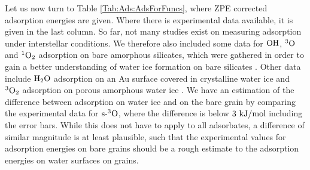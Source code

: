 \documentclass[8.5pt,twoside,twocolumn]{article}
\newcommand\zpe{\enmat{\te{ZPE}}}
\newcommand\sur{\enmat{\te{s-}}}
\renewcommand\K{{\enmat{~\te{K}}}}
\newcommand\tripo{\enmat{{^3\te{O}}}}
\newcommand\singot{\enmat{{^1\ot}}}
\newcommand\tripot{\enmat{{^3\ot}}}
\newcommand\kmo{\enmat{\te {kJ/mol}}}
\theoremstyle{standard}
\begin{document}
Let us now turn to Table \ref{Tab:Ads:AdsForFuncs}, where ZPE corrected adsorption
energies are given. Where there is experimental data available, it is given
in the last column. So far, not many studies exist on measuring 
adsorption under interstellar conditions. We therefore also included some data
for $\text O \text H$, $\tripo$ and $\singot$ adsorption on bare amorphous silicates, which were gathered in order to
gain a better understanding of water ice formation on bare silicates \cite{HeVidali2014,HeJingVidali2014}.
Other data include $\text H _2 \text O$ adsorption on an Au surface covered in crystalline water
ice\cite{Fraser2001} and $\tripot$ adsorption on porous amorphous water ice \cite{He2015}.
We have an estimation of the difference between adsorption on water ice and
on the bare grain by comparing the experimental data for $\sur\tripo$, where the difference
is below $3~\kmo$ including the error bars. While this does not have to apply to all
adsorbates, a difference of similar magnitude is at least plausible, such that
the experimental values for adsorption energies on bare grains should be a rough estimate
to the adsorption energies on water surfaces on grains.


\end{document}
